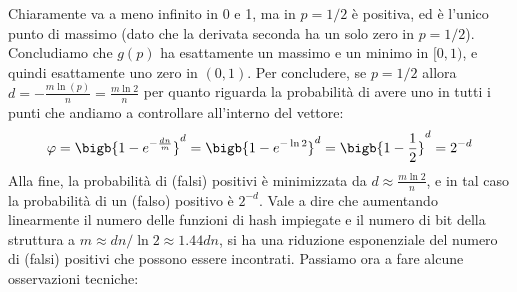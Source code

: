 Chiaramente va a meno infinito in 0  e 1, ma in $p = 1/2$ è positiva, ed è l'unico punto di massimo (dato che la derivata seconda ha un solo zero in $p = 1/2$). Concludiamo che $g(p)$ ha esattamente un massimo e un minimo in $[0, 1)$, e quindi esattamente uno zero in $(0, 1)$.
Per concludere, se $p = 1/2$ allora $d = - \frac{m\ln(p)}{n} = \frac{m\ln2}{n}$ per quanto riguarda la probabilità di avere uno in tutti i punti che andiamo a controllare all'interno del vettore:
\begin{equation*}
    \varphi = \bigb{1 - e^{-\frac{dn}{m}}}^d = \bigb{1 - e^{-\ln2}}^d = \bigb{1 - \frac{1}{2}}^d = 2^{-d}
\end{equation*}
Alla fine, la probabilità di (falsi) positivi è minimizzata da $d \approx \frac{m\ln2}{n}$, e in tal caso la probabilità di un (falso) positivo è $2^{-d}$. Vale a dire che aumentando linearmente il numero delle funzioni di hash impiegate e il numero di bit della struttura a $m \approx dn/\ln2 \approx 1.44dn$, si ha una riduzione esponenziale del numero di (falsi) positivi che possono essere incontrati.
Passiamo ora a fare alcune osservazioni tecniche:
